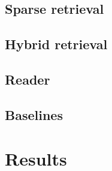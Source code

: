 \documentclass[11pt]{article}
\begin{document}
\subsection{Sparse retrieval}

\subsection{Hybrid retrieval}

\subsection{Reader}

\subsection{Baselines}

\section{Results}
\label{sec:results}

\end{document}
